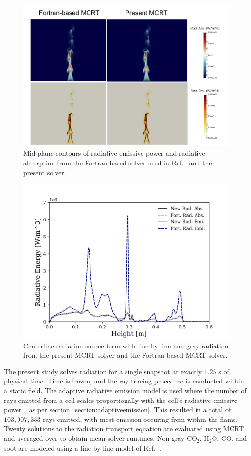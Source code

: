 \begin{figure}[!b]
\centering

\includegraphics[width=0.7\linewidth]{figures/ch4/PoolFire_Verification.png}
\caption{Mid-plane contours of radiative emissive power and radiative absorption from the Fortran-based solver used in Ref.~\cite{Wu2020DetailedFire} and the present solver.}
\label{fig:PoolFireVerificationColor}
\end{figure}


\begin{figure}[!bh]
\centering

\includegraphics[width=0.7\linewidth]{figures/ch4/lineplot_verification.png}
\caption{Centerline radiation source term with line-by-line non-gray radiation from the present MCRT solver and the Fortran-based MCRT solver.}
\label{fig:PoolFireVerificationLine}
\end{figure}

The present study solves radiation for a single snapshot at exactly $1.25$ s of physical time. Time is frozen, and the ray-tracing procedure is conducted within a static field. The adaptive radiative emission model is used where the number of rays emitted from a cell scales proportionally with the cell's radiative emissive power~\cite{Wang2007AnFields}, as per section~\ref{section:adaptiveemission}. This resulted in a total of $103,907,333$ rays emitted, with most emission occuring from within the flame. Twenty solutions to the radiation transport equation are evaluated using MCRT and averaged over to obtain mean solver runtimes.
Non-gray CO$_2$, H$_2$O, CO, and soot are modeled using a line-by-line model of Ref.~\cite{Ren2019Line-by-lineSystem}. 

